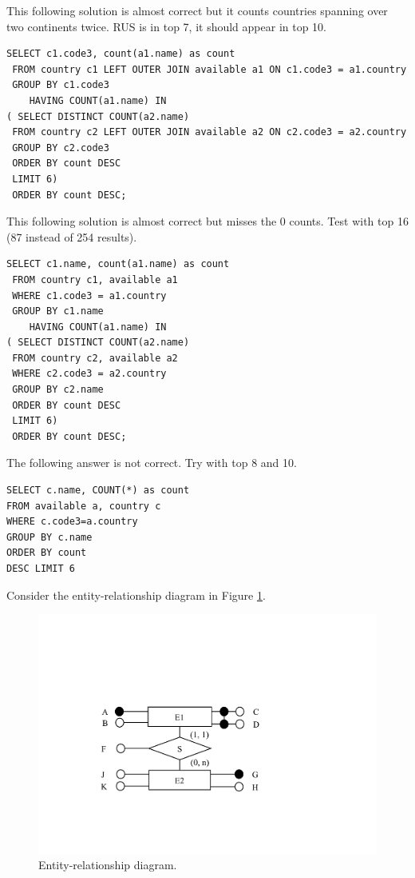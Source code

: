 \documentclass[10pt,a4paper,answers]{exam}
\begin{document}
\begin{questions}
\begin{parts}
\begin{solution}
This following solution is almost correct but it counts countries spanning over two continents twice. RUS is in top 7, it should appear in top 10. 
\begin{lstlisting}
SELECT c1.code3, count(a1.name) as count
 FROM country c1 LEFT OUTER JOIN available a1 ON c1.code3 = a1.country
 GROUP BY c1.code3
 	HAVING COUNT(a1.name) IN
( SELECT DISTINCT COUNT(a2.name) 
 FROM country c2 LEFT OUTER JOIN available a2 ON c2.code3 = a2.country
 GROUP BY c2.code3
 ORDER BY count DESC
 LIMIT 6)
 ORDER BY count DESC;
\end{lstlisting}
This following solution is almost correct but misses the 0 counts. Test with top 16 (87 instead of 254 results).
\begin{lstlisting}
SELECT c1.name, count(a1.name) as count
 FROM country c1, available a1
 WHERE c1.code3 = a1.country
 GROUP BY c1.name
 	HAVING COUNT(a1.name) IN
( SELECT DISTINCT COUNT(a2.name) 
 FROM country c2, available a2 
 WHERE c2.code3 = a2.country
 GROUP BY c2.name
 ORDER BY count DESC
 LIMIT 6)
 ORDER BY count DESC;
\end{lstlisting}

The following answer is not correct. Try with top 8 and 10.
\begin{lstlisting}
SELECT c.name, COUNT(*) as count 
FROM available a, country c
WHERE c.code3=a.country
GROUP BY c.name
ORDER BY count 
DESC LIMIT 6
\end{lstlisting}
\end{solution}
\end{parts}


\pagebreak
\question\label{ques:er} Consider the entity-relationship diagram in Figure \ref{fig:er}.

\begin{figure}
	\begin{center}
		\includegraphics[width=.7\textwidth]{er.pdf}
		\caption{Entity-relationship diagram.}
		\label{fig:er}
	\end{center}
\end{figure}\vspace{-5pt}


\end{questions}
\end{document}
